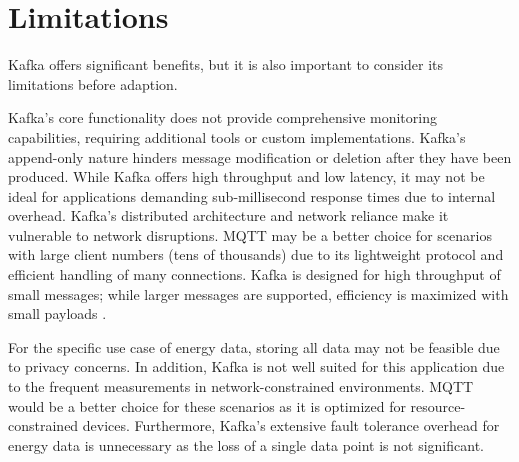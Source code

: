 \section{Limitations}
\label{cha:pros_cons}

Kafka offers significant benefits, but it is also important to consider its limitations before adaption.

Kafka's core functionality does not provide comprehensive monitoring capabilities, requiring additional tools or custom implementations. Kafka's append-only nature hinders message modification or deletion after they have been produced. While Kafka offers high throughput and low latency, it may not be ideal for applications demanding sub-millisecond response times due to internal overhead. Kafka's distributed architecture and network reliance make it vulnerable to network disruptions. MQTT may be a better choice for scenarios with large client numbers (tens of thousands) due to its lightweight protocol and efficient handling of many connections.
Kafka is designed for high throughput of small messages; while larger messages are supported, efficiency is maximized with small payloads \cite{Pacheco2023}.

For the specific use case of energy data, storing all data may not be feasible due to privacy concerns. In addition, Kafka is not well suited for this application due to the frequent measurements in network-constrained environments. MQTT would be a better choice for these scenarios as it is optimized for resource-constrained devices. Furthermore, Kafka's extensive fault tolerance overhead for energy data is unnecessary as the loss of a single data point is not significant.